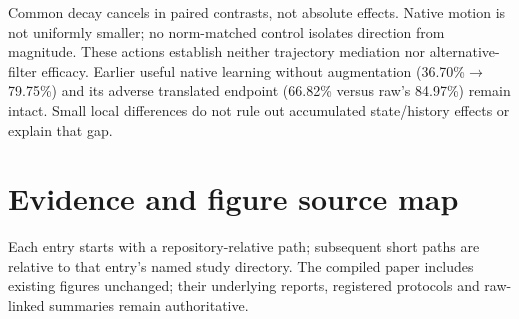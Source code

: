 \documentclass[10pt]{article}
\begin{document}
Common decay cancels in paired contrasts, not absolute effects. Native motion is not uniformly smaller; no norm-matched control isolates direction from magnitude. These actions establish neither trajectory mediation nor alternative-filter efficacy. Earlier useful native learning without augmentation (36.70\%$\to$79.75\%) and its adverse translated endpoint (66.82\% versus raw's 84.97\%) remain intact. Small local differences do not rule out accumulated state/history effects or explain that gap.

\clearpage
\section{Evidence and figure source map}\label{app:sources}
Each entry starts with a repository-relative path; subsequent short paths are relative to that entry's named study directory. The compiled paper includes existing figures unchanged; their underlying reports, registered protocols and raw-linked summaries remain authoritative.
\end{document}
